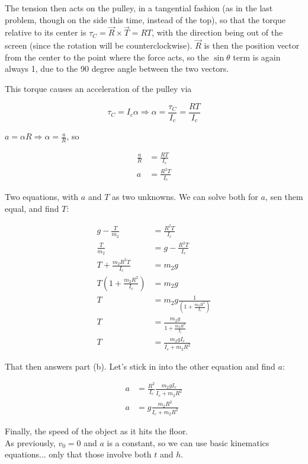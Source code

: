 \documentclass[8.01x]{subfiles}
\begin{document}
The tension then acts on the pulley, in a tangential fashion (as in the last problem, though on the side this time, instead of the top), so that the torque relative to its center is $\tau_C = \vec{R} \times \vec{T} = R T$, with the direction being out of the screen (since the rotation will be counterclockwise). $\vec{R}$ is then the position vector from the center to the point where the force acts, so the $\sin \theta$ term is again always 1, due to the 90 degree angle between the two vectors.

This torque causes an acceleration of the pulley via

\begin{equation}
\tau_C = I_c \alpha \Rightarrow \alpha = \frac{\tau_C}{I_c} = \frac{R T}{I_c}
\end{equation}

$\displaystyle a = \alpha R \Rightarrow \alpha = \frac{a}{R}$, so

\begin{align}
\frac{a}{R} &= \frac{R T}{I_c}\\
a &= \frac{R^2 T}{I_c}
\end{align}

Two equations, with $a$ and $T$ as two unknowns. We can solve both for $a$, sen them equal, and find $T$:

\begin{align}
g - \frac{T}{m_2} &= \frac{R^2 T}{I_c}\\
\frac{T}{m_2} &= g - \frac{R^2 T}{I_c}\\
T + \frac{m_2 R^2 T}{I_c}&= m_2 g\\
T \left(1 + \frac{m_2 R^2}{I_c}\right) &= m_2 g\\
T &= m_2 g \frac{1}{\left(1 + \frac{m_2 R^2}{I_c}\right)}\\
T &= \frac{m_2 g}{1 + \frac{m_2 R^2}{I_c}}\\
T &= \frac{m_2 g I_c}{I_c + m_2 R^2}
\end{align}

That then answers part (b). Let's stick in into the other equation and find $a$:

\begin{align}
a &= \frac{R^2}{I_c} \frac{m_2 g I_c}{I_c + m_2 R^2}\\
a &= g \frac{m_2 R^2}{I_c + m_2 R^2}
\end{align}

Finally, the speed of the object as it hits the floor.\\
As previously, $v_0 = 0$ and $a$ is a constant, so we can use basic kinematics equations... only that those involve both $t$ and $h$.
\end{document}
